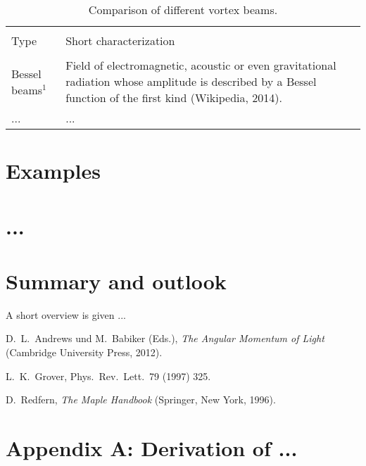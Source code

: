 \documentclass[11pt]{article}
\begin{document}
%
%
%
%
%
%
\begin{table}
\begin{small}
\caption{\rm Comparison of different vortex beams.}
\label{vortex-beams}
\begin{center}
\begin{tabular}{p{6.7cm} p{7.8cm}}
   \\[-0.4cm] \hline \hline \\[-0.4cm]
   Type  & Short characterization
   \\[0.1cm]  \hline  \\[-0.25cm]
   Bessel beams$^1$ & Field of electromagnetic, acoustic or even gravitational radiation whose amplitude is described 
                      by a Bessel function of the first kind (Wikipedia, 2014). \\[0.1cm]
   ...              & ...  \\[0.1cm]
   \hline \hline
\end{tabular}
\end{center}
\vspace{0.2cm}
\end{small}
\end{table}


%
%
%
%
%
\section{Examples}  


%
%
%
%
%
\section{...}  


%
%
%
%
%
\section{Summary and outlook}  \label{sec_outlook}

A short overview is given ...


%
%
%
%
%
\begin{thebibliography}{99}

   D.~L.~Andrews und M.~Babiker (Eds.), \textit{The Angular Momentum of Light} (Cambridge University Press, 2012).

   L.~K.~Grover, Phys.\ Rev.\ Lett.\ 79 (1997) 325.

   D.~Redfern, \textit{The Maple Handbook} (Springer, New York, 1996).

\end{thebibliography}








\newpage
%
%
%
%
%

\appendix

\section*{Appendix A: \hspace{0.02cm} Derivation of ...}
\end{document}

